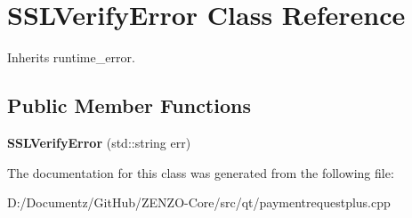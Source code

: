 \hypertarget{class_s_s_l_verify_error}{}\section{S\+S\+L\+Verify\+Error Class Reference}
\label{class_s_s_l_verify_error}


Inherits runtime\+\_\+error.

\subsection*{Public Member Functions}
\begin{DoxyCompactItemize}
\item 
\mbox{\label{class_s_s_l_verify_error_a3183bdade1e32616a651654ed921baba}} 
{\bfseries S\+S\+L\+Verify\+Error} (std\+::string err)
\end{DoxyCompactItemize}


The documentation for this class was generated from the following file\+:\begin{DoxyCompactItemize}
\item 
D\+:/\+Documentz/\+Git\+Hub/\+Z\+E\+N\+Z\+O-\/\+Core/src/qt/paymentrequestplus.\+cpp\end{DoxyCompactItemize}
